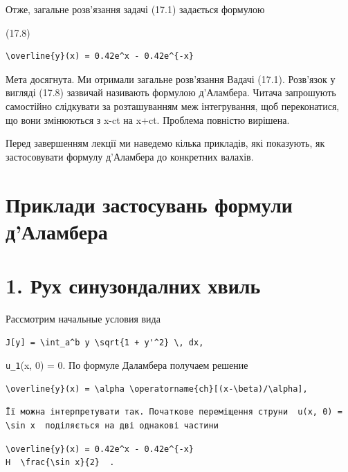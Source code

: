\documentclass[
  ukrainian,
]{article}
\begin{document}
Отже, загальне розв'язання задачі (17.1) задається формулою

(17.8)

\begin{verbatim}
\overline{y}(x) = 0.42e^x - 0.42e^{-x}
\end{verbatim}

Мета досягнута. Ми отримали загальне розв'язання Вадачі (17.1).
Розв'язок у вигляді (17.8) зазвичай називають формулою д'Аламбера.
Читача запрошують самостійно слідкувати за розташуванням меж
інтегрування, щоб переконатися, що вони змінюються з x-ct на x+ct.
Проблема повністю вирішена.

Перед завершенням лекції ми наведемо кілька прикладів, які показують, як
застосовувати формулу д'Аламбера до конкретних валахів.

\section{Приклади застосувань формули
д'Аламбера}\label{ux43fux440ux438ux43aux43bux430ux434ux438-ux437ux430ux441ux442ux43eux441ux443ux432ux430ux43dux44c-ux444ux43eux440ux43cux443ux43bux438-ux434ux430ux43bux430ux43cux431ux435ux440ux430}

\section{1. Рух синузондалних
хвиль}\label{ux440ux443ux445-ux441ux438ux43dux443ux437ux43eux43dux434ux430ux43bux43dux438ux445-ux445ux432ux438ux43bux44c}

Рассмотрим начальные условия вида

\begin{verbatim}
J[y] = \int_a^b y \sqrt{1 + y'^2} \, dx,
\end{verbatim}

\texttt{u\_1}(x, 0) = 0. По формуле Даламбера получаем решение

\begin{verbatim}
\overline{y}(x) = \alpha \operatorname{ch}[(x-\beta)/\alpha],
\end{verbatim}

\begin{verbatim}
Її можна інтерпретувати так. Початкове переміщення струни  u(x, 0) = \sin x  поділяється на дві однакові частини
\end{verbatim}

\begin{verbatim}
\overline{y}(x) = 0.42e^x - 0.42e^{-x}
H  \frac{\sin x}{2}  .
\end{verbatim}
\end{document}
